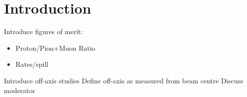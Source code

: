 \section{Introduction}
\label{hptpcPaper:sec:Introduction}

Introduce figures of merit:
\begin{itemize}
    \item Proton/Pion+Muon Ratio
    \item Rates/spill
\end{itemize}
Introduce off-axis studies
Define off-axis as measured from beam centre
Discuss moderator